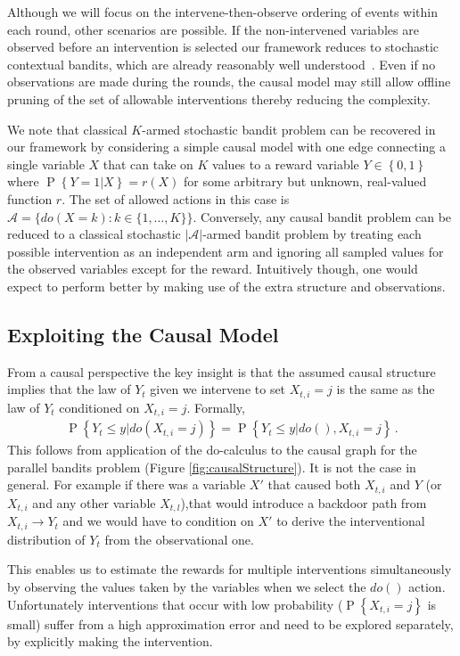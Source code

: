 \documentclass{article}
\newcommand{\set}[1]{\left\{#1\right\}}
\newcommand{\eqn}[1]{\begin{align}#1\end{align}}
\renewcommand{\P}[1]{\operatorname{P}\left\{#1\right\}}
\theoremstyle{plain}
\theoremstyle{definition}
\begin{document}
Although we will focus on the intervene-then-observe ordering of events within each round, other scenarios are possible. If the non-intervened variables are observed before an intervention is selected our framework reduces to stochastic contextual bandits, which are already reasonably well understood~\citep{Agarwal2014}. Even if no observations are made during the rounds, the causal model may still allow offline pruning of the set of allowable interventions thereby reducing the complexity.

We note that classical $K$-armed stochastic bandit problem can be recovered in our framework by considering a simple causal model with one edge connecting a single variable $X$ that can take on $K$ values to a reward variable $Y \in \set{0,1}$ where $\P{Y = 1|X} = r(X)$ for some arbitrary but unknown, real-valued function $r$. The set of allowed actions in this case is $\mathcal{A} = \{ do(X = k) \colon k \in \{1, \ldots, K\}\}$. Conversely, any causal bandit problem can be reduced to a classical stochastic $|\mathcal{A}|$-armed bandit problem by treating each possible intervention as an independent arm and ignoring all sampled values for the observed variables except for the reward. Intuitively though, one would expect to perform better by making use of the extra structure and observations.


\iffalse
\subsection{Exploiting the Causal Model}

From a causal perspective the key insight is that the assumed causal structure implies that
the law of $Y_t$ given we intervene to set $X_{t,i} = j$ is the same as the law of $Y_t$ conditioned
on $X_{t,i} = j$. Formally,
\eqn {
\label{eq:observe}
\P{Y_t \leq y|do(X_{t,i} = j)} = \P{Y_t \leq y|do(),X_{t,i} = j}\,.
}
This follows from application of the do-calculus \cite{Pearl2000} to the causal graph for the parallel bandits problem (Figure \ref{fig:causalStructure}). It is not the case in general. 
For example if there was a variable $X'$ that caused both $X_{t,i}$ and $Y$ (or $X_{t,i}$ and any other variable $X_{t,l}$),that would introduce a backdoor path from $X_{t,i} \rightarrow Y_t$ and we would have to condition on $X'$ to derive the interventional distribution of $Y_t$ from the observational one.

This enables us to estimate the rewards for multiple interventions simultaneously by observing the values taken by the variables when we select the $do()$ action. Unfortunately interventions that occur with low probability ($\P{X_{t,i} = j}$ is small) suffer from a high approximation error and need to be explored separately, by explicitly making the intervention. 
\end{document}
